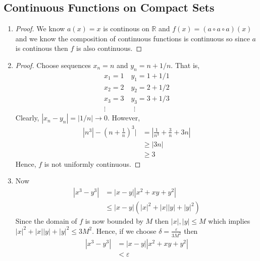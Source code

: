 \subsection{Continuous Functions on Compact Sets}

\begin{enumerate}[label=(\alph*)]
    \item 
    \begin{proof}
        We know $a(x) = x$ is continous on $\mathbb{R}$ and $f(x) 
        = (a\circ a\circ a)(x)$ and we know the composition of continuous 
        functions is continuous so since $a$ is continous then $f$ is also 
        continuous.
    \end{proof}

    \item
    \begin{proof}
        Choose sequences $x_n = n$ and $y_n=n+1/n$. 
        That is,
        \begin{gather*}
            x_1 = 1 \quad y_1 = 1+1/1 \\
            x_2 = 2 \quad y_2 = 2+1/2 \\
            x_3 = 3 \quad y_3 = 3+1/3 \\
            \vdots \qquad \qquad \vdots
        \end{gather*} 
        Clearly, $|x_n-y_n| = |1/n|\rightarrow 0$. However, 
        \begin{align*}
            |n^3| - (n+\frac{1}{n})^3| &= |\frac{1}{n^3}+\frac{3}{n}+3n| \\
            &\geq |3n| \\
            &\geq 3
        \end{align*}
        Hence, $f$ is not uniformly continuous.
    \end{proof}

    \item
    Now
    \begin{align*}
        |x^3-y^3| &= |x-y||x^2+xy+y^2| \\
        &\leq |x-y|(|x|^2+|x||y|+|y|^2)
    \end{align*}
    Since the domain of $f$ is now bounded by $M$ then 
    $|x|, |y| \leq M$ which implies $|x|^2+|x||y|+|y|^2 \leq 3M^2$.
    Hence, if we choose $\delta = \frac{\varepsilon}{3M^2}$ then 
    \begin{align*}
        |x^3-y^3| &= |x-y||x^2+xy+y^2| \\
        &< \varepsilon
    \end{align*}    
\end{enumerate}


